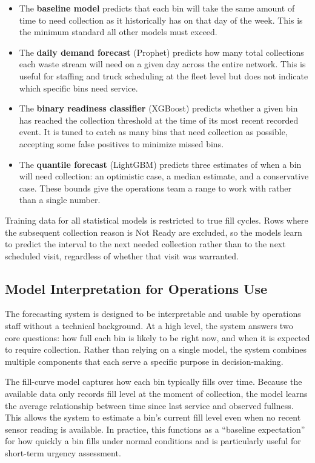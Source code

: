 \documentclass[11pt]{article}
\begin{document}
\begin{itemize}
  \item The \textbf{baseline model} predicts that each bin will take the same amount of
  time to need collection as it historically has on that day of the week. This is the
  minimum standard all other models must exceed.

  \item The \textbf{daily demand forecast} (Prophet) predicts how many total collections
  each waste stream will need on a given day across the entire network. This is useful for
  staffing and truck scheduling at the fleet level but does not indicate which specific
  bins need service.

  \item The \textbf{binary readiness classifier} (XGBoost) predicts whether a given bin has reached the collection threshold at the time of its most recent recorded event. It is tuned to catch as many bins that need collection as
  possible, accepting some false positives to minimize missed bins.

  \item The \textbf{quantile forecast} (LightGBM) predicts three estimates of when a bin
  will need collection: an optimistic case, a median estimate, and a conservative case. These bounds give the operations team a range to work with rather than a single number.
\end{itemize}


Training data for all statistical models is restricted to true fill cycles. Rows where
the subsequent collection reason is Not Ready are excluded, so the models learn to predict
the interval to the next needed collection rather than to the next scheduled visit,
regardless of whether that visit was warranted.

\subsection{Model Interpretation for Operations Use}
The forecasting system is designed to be interpretable and usable by operations staff without a technical background. At a high level, the system answers two core questions: how full each bin is likely to be right now, and when it is expected to require collection. Rather than relying on a single model, the system combines multiple components that each serve a specific purpose in decision-making.

The fill-curve model captures how each bin typically fills over time. Because the available data only records fill level at the moment of collection, the model learns the average relationship between time since last service and observed fullness. This allows the system to estimate a bin’s current fill level even when no recent sensor reading is available. In practice, this functions as a “baseline expectation” for how quickly a bin fills under normal conditions and is particularly useful for short-term urgency assessment.
\end{document}
